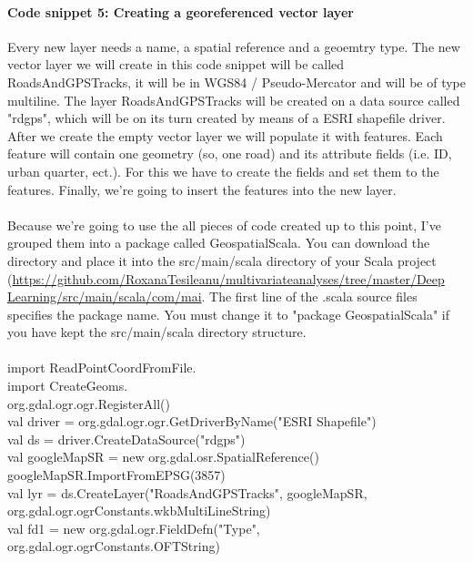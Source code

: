 \documentclass {article}
\begin{document}
\paragraph {Code snippet 5: Creating a georeferenced vector layer}
Every new layer needs a name, a spatial reference and a geoemtry type. The new vector layer we will create in this code snippet will be called RoadsAndGPSTracks, it will be in WGS84 / Pseudo-Mercator and will be of type multiline.
 The layer RoadsAndGPSTracks will be created on a data source called "rdgps", which will be on its turn created by means of a ESRI shapefile driver. After we create the empty vector layer we will populate it with features.
 Each feature will contain one geometry (so, one road) and its attribute fields (i.e. ID, urban quarter, ect.). For this we have to create the fields and set them to the features. Finally, we're going to insert the features into the new layer.\\
\\
Because we're going to use the all pieces of code created up to this point, I've grouped them into a package called GeospatialScala.
You can download the directory and place it into the src/main/scala directory of your Scala project (\href{https://github.com/RoxanaTesileanu/multivariate_analyses/tree/master/DeepLearning/src/main/scala/com/mai}{https://github.com/RoxanaTesileanu/multivariate\underline{\space}analyses/tree/master/Deep\\Learning/src/main/scala/com/mai}. The first line of the .scala source files specifies the package name. You must change it to "package GeospatialScala" if you have kept the src/main/scala directory structure.      
\\
\\
import ReadPointCoordFromFile.\underline{\space} \\
import CreateGeoms.\underline{\space}\\
org.gdal.ogr.ogr.RegisterAll() \\
val driver = org.gdal.ogr.ogr.GetDriverByName("ESRI Shapefile")\\
val ds = driver.CreateDataSource("rdgps")\\
val googleMapSR = new org.gdal.osr.SpatialReference()\\
googleMapSR.ImportFromEPSG(3857)\\
val lyr = ds.CreateLayer("RoadsAndGPSTracks", googleMapSR,\\
 org.gdal.ogr.ogrConstants.wkbMultiLineString)\\
val fd1 = new org.gdal.ogr.FieldDefn("Type", org.gdal.ogr.ogrConstants.OFTString)\\
\end{document}
